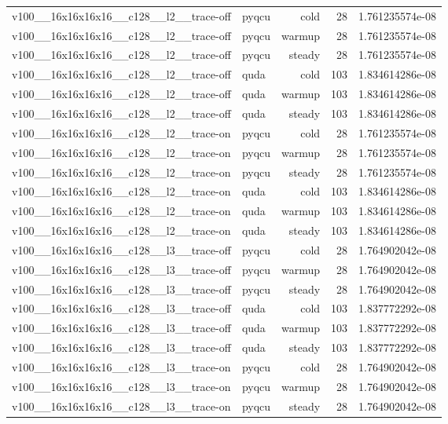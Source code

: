 \begin{table}[htbp]
\begin{tabular}{@{}llrrr@{}}
v100\_\_16x16x16x16\_\_c128\_\_l2\_\_trace-off & pyqcu & cold & 28 & 1.761235574e-08 \\
v100\_\_16x16x16x16\_\_c128\_\_l2\_\_trace-off & pyqcu & warmup & 28 & 1.761235574e-08 \\
v100\_\_16x16x16x16\_\_c128\_\_l2\_\_trace-off & pyqcu & steady & 28 & 1.761235574e-08 \\
v100\_\_16x16x16x16\_\_c128\_\_l2\_\_trace-off & quda & cold & 103 & 1.834614286e-08 \\
v100\_\_16x16x16x16\_\_c128\_\_l2\_\_trace-off & quda & warmup & 103 & 1.834614286e-08 \\
v100\_\_16x16x16x16\_\_c128\_\_l2\_\_trace-off & quda & steady & 103 & 1.834614286e-08 \\
v100\_\_16x16x16x16\_\_c128\_\_l2\_\_trace-on & pyqcu & cold & 28 & 1.761235574e-08 \\
v100\_\_16x16x16x16\_\_c128\_\_l2\_\_trace-on & pyqcu & warmup & 28 & 1.761235574e-08 \\
v100\_\_16x16x16x16\_\_c128\_\_l2\_\_trace-on & pyqcu & steady & 28 & 1.761235574e-08 \\
v100\_\_16x16x16x16\_\_c128\_\_l2\_\_trace-on & quda & cold & 103 & 1.834614286e-08 \\
v100\_\_16x16x16x16\_\_c128\_\_l2\_\_trace-on & quda & warmup & 103 & 1.834614286e-08 \\
v100\_\_16x16x16x16\_\_c128\_\_l2\_\_trace-on & quda & steady & 103 & 1.834614286e-08 \\
v100\_\_16x16x16x16\_\_c128\_\_l3\_\_trace-off & pyqcu & cold & 28 & 1.764902042e-08 \\
v100\_\_16x16x16x16\_\_c128\_\_l3\_\_trace-off & pyqcu & warmup & 28 & 1.764902042e-08 \\
v100\_\_16x16x16x16\_\_c128\_\_l3\_\_trace-off & pyqcu & steady & 28 & 1.764902042e-08 \\
v100\_\_16x16x16x16\_\_c128\_\_l3\_\_trace-off & quda & cold & 103 & 1.837772292e-08 \\
v100\_\_16x16x16x16\_\_c128\_\_l3\_\_trace-off & quda & warmup & 103 & 1.837772292e-08 \\
v100\_\_16x16x16x16\_\_c128\_\_l3\_\_trace-off & quda & steady & 103 & 1.837772292e-08 \\
v100\_\_16x16x16x16\_\_c128\_\_l3\_\_trace-on & pyqcu & cold & 28 & 1.764902042e-08 \\
v100\_\_16x16x16x16\_\_c128\_\_l3\_\_trace-on & pyqcu & warmup & 28 & 1.764902042e-08 \\
v100\_\_16x16x16x16\_\_c128\_\_l3\_\_trace-on & pyqcu & steady & 28 & 1.764902042e-08 \\

\end{tabular}
\end{table}
